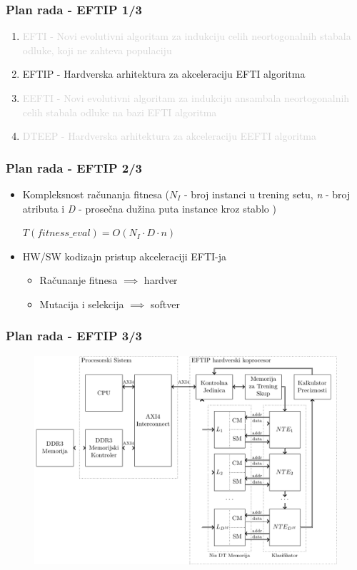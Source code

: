 \documentclass{beamer}
\newcommand{\light}[1]{\textcolor{lightgray}{#1}}
\begin{document}
\begin{frame}
\frametitle{Plan rada - EFTIP 1/3}
\begin{enumerate}
\setlength{\itemsep}{\fill}
\item\light{EFTI - Novi evolutivni algoritam za indukciju celih neortogonalnih stabala
odluke, koji ne zahteva populaciju}
\item EFTIP - Hardverska arhitektura za akceleraciju EFTI algoritma
\item\light{EEFTI - Novi evolutivni algoritam za indukciju ansambala neortogonalnih celih
stabala odluke na bazi EFTI algoritma}
\item\light{DTEEP - Hardverska arhitektura za akceleraciju EEFTI algoritma}
\end{enumerate}
\end{frame}


\begin{frame}
\frametitle{Plan rada - EFTIP 2/3}
\begin{itemize}
\setlength{\itemsep}{\fill}
\item Kompleksnost računanja fitnesa (\(N_{I}\) - broj instanci u trening setu, \emph{n} - 
broj atributa i \emph{D} - prosečna dužina puta instance kroz stablo )\\
\vspace{1em}
\centerline{$T(fitness\_eval) = O(N_{I}\cdot D\cdot n)$}
\item HW/SW kodizajn pristup akceleraciji EFTI-ja
\begin{itemize}
\item Računanje fitnesa $\implies$ hardver
\item Mutacija i selekcija $\implies$ softver
\end{itemize}
\end{itemize}
\end{frame}


\begin{frame}[fragile]
\frametitle{Plan rada - EFTIP 3/3}
\begin{figure}
\includegraphics[width=0.9\linewidth]{eftip_architecture.pdf}
\end{figure}
\end{frame}
\end{document}
